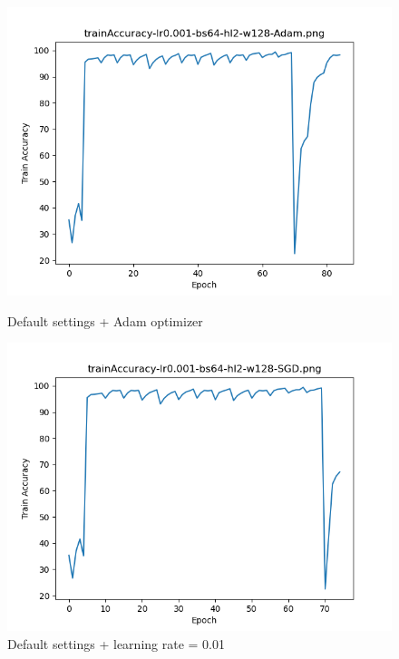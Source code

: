 \documentclass{article}[12pt]
\begin{document}
    \begin{figure}[H]
        \includegraphics[width=\linewidth]{testsResults/trainAccuracy/def.png}
        \caption{Default settings + Adam optimizer}
        \endminipage\hfill
        \includegraphics[width=\linewidth]{testsResults/trainAccuracy/trainAccuracy-lr0.001-bs64-hl2-w128-SGD.png}
        \caption{Default settings + learning rate = 0.01}
        \endminipage
    \end{figure}
\end{document}
